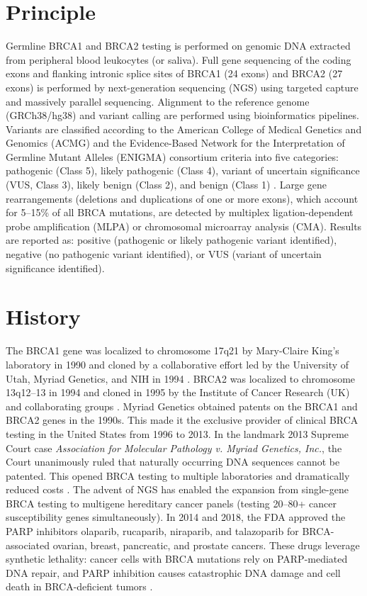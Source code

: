 \section*{Principle}
Germline BRCA1 and BRCA2 testing is performed on genomic DNA extracted from peripheral blood leukocytes (or saliva). Full gene sequencing of the coding exons and flanking intronic splice sites of BRCA1 (24 exons) and BRCA2 (27 exons) is performed by next-generation sequencing (NGS) using targeted capture and massively parallel sequencing. Alignment to the reference genome (GRCh38/hg38) and variant calling are performed using bioinformatics pipelines. Variants are classified according to the American College of Medical Genetics and Genomics (ACMG) and the Evidence-Based Network for the Interpretation of Germline Mutant Alleles (ENIGMA) consortium criteria into five categories: pathogenic (Class 5), likely pathogenic (Class 4), variant of uncertain significance (VUS, Class 3), likely benign (Class 2), and benign (Class 1) \cite{richards2015standards}. Large gene rearrangements (deletions and duplications of one or more exons), which account for 5--15\% of all BRCA mutations, are detected by multiplex ligation-dependent probe amplification (MLPA) or chromosomal microarray analysis (CMA). Results are reported as: positive (pathogenic or likely pathogenic variant identified), negative (no pathogenic variant identified), or VUS (variant of uncertain significance identified).

\section*{History}
The BRCA1 gene was localized to chromosome 17q21 by Mary-Claire King's laboratory in 1990 \cite{hall1990linkage} and cloned by a collaborative effort led by the University of Utah, Myriad Genetics, and NIH in 1994 \cite{miki1994strong}. BRCA2 was localized to chromosome 13q12--13 in 1994 \cite{wooster1994localization} and cloned in 1995 by the Institute of Cancer Research (UK) and collaborating groups \cite{wooster1995identification}. Myriad Genetics obtained patents on the BRCA1 and BRCA2 genes in the 1990s. This made it the exclusive provider of clinical BRCA testing in the United States from 1996 to 2013. In the landmark 2013 Supreme Court case \textit{Association for Molecular Pathology v. Myriad Genetics, Inc.}, the Court unanimously ruled that naturally occurring DNA sequences cannot be patented. This opened BRCA testing to multiple laboratories and dramatically reduced costs \cite{myriad2013supremecourt}. The advent of NGS has enabled the expansion from single-gene BRCA testing to multigene hereditary cancer panels (testing 20--80+ cancer susceptibility genes simultaneously). In 2014 and 2018, the FDA approved the PARP inhibitors olaparib, rucaparib, niraparib, and talazoparib for BRCA-associated ovarian, breast, pancreatic, and prostate cancers. These drugs leverage synthetic lethality: cancer cells with BRCA mutations rely on PARP-mediated DNA repair, and PARP inhibition causes catastrophic DNA damage and cell death in BRCA-deficient tumors \cite{robson2017olaparib}.


